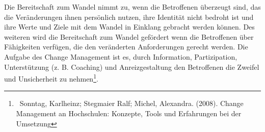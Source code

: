 \documentclass{article}
\begin{document}
\bigskip

Die Bereitschaft zum Wandel nimmt zu, wenn die Betroffenen überzeugt sind, das die Veränderungen ihnen persönlich
nutzen, ihre Identität nicht bedroht ist und ihre Werte und Ziele mit dem Wandel in Einklang gebracht werden können.
Des weiteren wird die Bereitschaft zum Wandel gefördert wenn die Betroffenen über Fähigkeiten verfügen, die den
veränderten Anforderungen gerecht werden. Die Aufgabe des Change Management ist es, durch Information, Partizipation,
Unterstützung (z. B. Coaching) und Anreizgestaltung den Betroffenen die Zweifel und Unsicherheit zu
nehmen\footnote{\ Sonntag, Karlheinz; Stegmaier Ralf; Michel, Alexandra. (2008). Change Management an Hochschulen:
Konzepte, Tools und Erfahrungen bei der Umsetzung}. 


\bigskip
\end{document}
